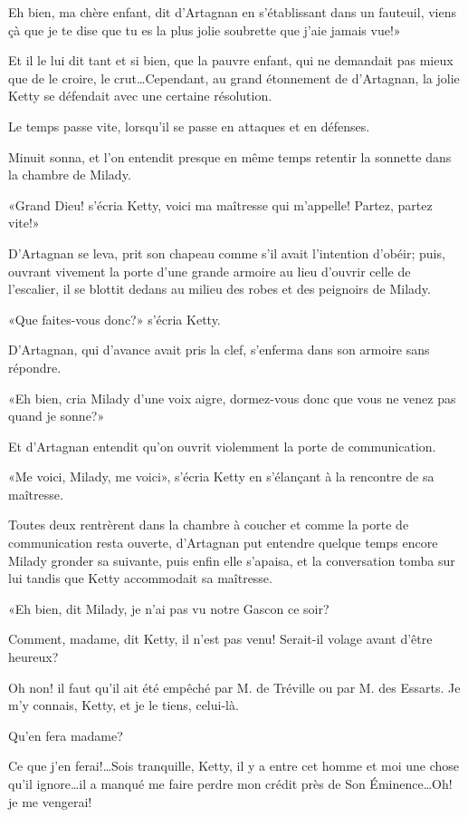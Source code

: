 \speak  Eh bien, ma chère enfant, dit d'Artagnan en s'établissant dans un fauteuil, viens çà que je te dise que tu es la plus jolie soubrette que j'aie jamais vue!» 

Et il le lui dit tant et si bien, que la pauvre enfant, qui ne demandait pas mieux que de le croire, le crut\dots Cependant, au grand étonnement de d'Artagnan, la jolie Ketty se défendait avec une certaine résolution. 

Le temps passe vite, lorsqu'il se passe en attaques et en défenses. 

Minuit sonna, et l'on entendit presque en même temps retentir la sonnette dans la chambre de Milady. 

«Grand Dieu! s'écria Ketty, voici ma maîtresse qui m'appelle! Partez, partez vite!» 

D'Artagnan se leva, prit son chapeau comme s'il avait l'intention d'obéir; puis, ouvrant vivement la porte d'une grande armoire au lieu d'ouvrir celle de l'escalier, il se blottit dedans au milieu des robes et des peignoirs de Milady. 

«Que faites-vous donc?» s'écria Ketty. 

D'Artagnan, qui d'avance avait pris la clef, s'enferma dans son armoire sans répondre. 

«Eh bien, cria Milady d'une voix aigre, dormez-vous donc que vous ne venez pas quand je sonne?» 

Et d'Artagnan entendit qu'on ouvrit violemment la porte de communication. 

«Me voici, Milady, me voici», s'écria Ketty en s'élançant à la rencontre de sa maîtresse. 

Toutes deux rentrèrent dans la chambre à coucher et comme la porte de communication resta ouverte, d'Artagnan put entendre quelque temps encore Milady gronder sa suivante, puis enfin elle s'apaisa, et la conversation tomba sur lui tandis que Ketty accommodait sa maîtresse. 

«Eh bien, dit Milady, je n'ai pas vu notre Gascon ce soir? 

\speak  Comment, madame, dit Ketty, il n'est pas venu! Serait-il volage avant d'être heureux? 

\speak  Oh non! il faut qu'il ait été empêché par M. de Tréville ou par M. des Essarts. Je m'y connais, Ketty, et je le tiens, celui-là. 

\speak  Qu'en fera madame? 

\speak  Ce que j'en ferai!\dots Sois tranquille, Ketty, il y a entre cet homme et moi une chose qu'il ignore\dots il a manqué me faire perdre mon crédit près de Son Éminence\dots Oh! je me vengerai! 

